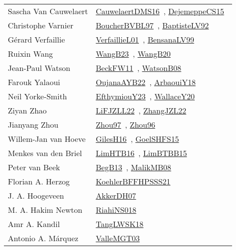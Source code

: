 {\begin{longtable}{p{4cm}p{20cm}}
Sascha Van Cauwelaert & \href{works/CauwelaertDMS16.pdf}{CauwelaertDMS16}~\cite{CauwelaertDMS16}, \href{works/DejemeppeCS15.pdf}{DejemeppeCS15}~\cite{DejemeppeCS15}\\
Christophe Varnier & \href{}{BoucherBVBL97}~\cite{BoucherBVBL97}, \href{works/BaptisteLV92.pdf}{BaptisteLV92}~\cite{BaptisteLV92}\\
G{\'{e}}rard Verfaillie & \href{works/VerfaillieL01.pdf}{VerfaillieL01}~\cite{VerfaillieL01}, \href{works/BensanaLV99.pdf}{BensanaLV99}~\cite{BensanaLV99}\\
Ruixin Wang & \href{works/WangB23.pdf}{WangB23}~\cite{WangB23}, \href{works/WangB20.pdf}{WangB20}~\cite{WangB20}\\
Jean{-}Paul Watson & \href{}{BeckFW11}~\cite{BeckFW11}, \href{works/WatsonB08.pdf}{WatsonB08}~\cite{WatsonB08}\\
Farouk Yalaoui & \href{works/OujanaAYB22.pdf}{OujanaAYB22}~\cite{OujanaAYB22}, \href{works/ArbaouiY18.pdf}{ArbaouiY18}~\cite{ArbaouiY18}\\
Neil Yorke{-}Smith & \href{works/EfthymiouY23.pdf}{EfthymiouY23}~\cite{EfthymiouY23}, \href{works/WallaceY20.pdf}{WallaceY20}~\cite{WallaceY20}\\
Ziyan Zhao & \href{works/LiFJZLL22.pdf}{LiFJZLL22}~\cite{LiFJZLL22}, \href{works/ZhangJZL22.pdf}{ZhangJZL22}~\cite{ZhangJZL22}\\
Jianyang Zhou & \href{works/Zhou97.pdf}{Zhou97}~\cite{Zhou97}, \href{works/Zhou96.pdf}{Zhou96}~\cite{Zhou96}\\
Willem{-}Jan van Hoeve & \href{works/GilesH16.pdf}{GilesH16}~\cite{GilesH16}, \href{works/GoelSHFS15.pdf}{GoelSHFS15}~\cite{GoelSHFS15}\\
Menkes van den Briel & \href{works/LimHTB16.pdf}{LimHTB16}~\cite{LimHTB16}, \href{works/LimBTBB15.pdf}{LimBTBB15}~\cite{LimBTBB15}\\
Peter van Beek & \href{works/BegB13.pdf}{BegB13}~\cite{BegB13}, \href{}{MalikMB08}~\cite{MalikMB08}\\
Florian A. Herzog & \href{works/KoehlerBFFHPSSS21.pdf}{KoehlerBFFHPSSS21}~\cite{KoehlerBFFHPSSS21}\\
J. A. Hoogeveen & \href{works/AkkerDH07.pdf}{AkkerDH07}~\cite{AkkerDH07}\\
M. A. Hakim Newton & \href{works/RiahiNS018.pdf}{RiahiNS018}~\cite{RiahiNS018}\\
Amr A. Kandil & \href{works/TangLWSK18.pdf}{TangLWSK18}~\cite{TangLWSK18}\\
Antonio A. M{\'{a}}rquez & \href{works/ValleMGT03.pdf}{ValleMGT03}~\cite{ValleMGT03}\\

\end{longtable}}
